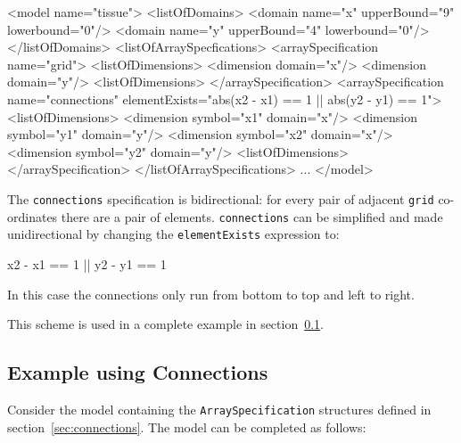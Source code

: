 \documentclass{cekarticle}
\begin{document}
\begin{example}
<model name="tissue">
    <listOfDomains>
        <domain name="x" upperBound="9" lowerbound="0"/>
        <domain name="y" upperBound="4" lowerbound="0"/>
    </listOfDomains>
    <listOfArraySpecfications>
        <arraySpecification name="grid">
            <listOfDimensions>
                <dimension domain="x"/>
                <dimension domain="y"/>
            <listOfDimensions>
        </arraySpecification>
        <arraySpecification
            name="connections"
            elementExists="abs(x2 - x1) == 1 || abs(y2 - y1) == 1">
            <listOfDimensions>
                <dimension symbol="x1" domain="x"/>
                <dimension symbol="y1" domain="y"/>
                <dimension symbol="x2" domain="x"/>
                <dimension symbol="y2" domain="y"/>
            <listOfDimensions>
        </arraySpecification>
    </listOfArraySpecifications>
    ...
</model>
\end{example}

The \texttt{connections} specification is bidirectional: for every
pair of adjacent \texttt{grid} co-ordinates there are a pair of
elements. \texttt{connections} can be simplified and made
unidirectional by changing the \texttt{elementExists} expression
to:
\begin{example}
x2 - x1 == 1 || y2 - y1 == 1
\end{example}
In this case the connections only run from bottom to top and left
to right.

This scheme is used in a complete example in
section~\ref{sec:complexeg}.

\subsection{Example using Connections}
\label{sec:complexeg}

Consider the model containing the \texttt{ArraySpecification}
structures defined in section~\ref{sec:connections}.  The model
can be completed as follows:
\end{document}
